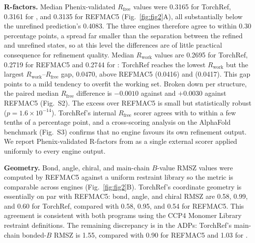 \documentclass{iucrjournals}
\begin{document}
\textbf{R-factors.}
Median Phenix-validated $R_\mathrm{free}$ values were \num{0.3165} for
TorchRef, \num{0.3161} for , and \num{0.3135} for REFMAC5
(Fig.\ \ref{fig:fig2}A), all substantially below the unrefined prediction's \num{0.4083}.
The three engines therefore agree to within \num{0.30} percentage points, a spread
far smaller than the separation between the refined and unrefined states, so at this
level the differences are of little practical consequence for refinement quality.
Median $R_\mathrm{work}$ values are \num{0.2695} for TorchRef,
\num{0.2719} for REFMAC5 and \num{0.2744} for : TorchRef reaches
the lowest $R_\mathrm{work}$ but the largest $R_\mathrm{work}$--$R_\mathrm{free}$ gap,
\num{0.0470}, above REFMAC5 (\num{0.0416}) and  (\num{0.0417}).
This gap points to a mild tendency to overfit the working set. 
Broken down per structure, the paired median $R_\mathrm{free}$
difference is $-0.0010$ against  and $+0.0030$ against REFMAC5
(Fig.\ S2). The excess over REFMAC5 is small but statistically robust
($p = 1.6\times10^{-14}$).
TorchRef's internal
$R_\mathrm{free}$ scorer agrees with  to within
a few tenths of a percentage point, and a cross-scoring analysis on the AlphaFold
benchmark (Fig.\ S3) confirms that no engine favours its own refinement output.
We report Phenix-validated R-factors from  as a
single external scorer applied uniformly to every engine output.

\textbf{Geometry.}
Bond, angle, chiral, and main-chain $B$-value RMSZ values were computed by REFMAC5
against a uniform restraint library so the metric is comparable across
engines (Fig.\ \ref{fig:fig2}B).
TorchRef's coordinate geometry is essentially on par with REFMAC5: bond, angle, and chiral RMSZ are
\num{0.58}, \num{0.99}, and \num{0.60} for TorchRef, compared with \num{0.58},
\num{0.95}, and \num{0.54} for REFMAC5. This agreement is consistent with both
programs using the CCP4 Monomer Library restraint definitions. The remaining
discrepancy is in the ADPs: TorchRef's main-chain bonded-$B$ RMSZ is \num{1.55},
compared with \num{0.90} for REFMAC5 and \num{1.03} for . 
\end{document}
